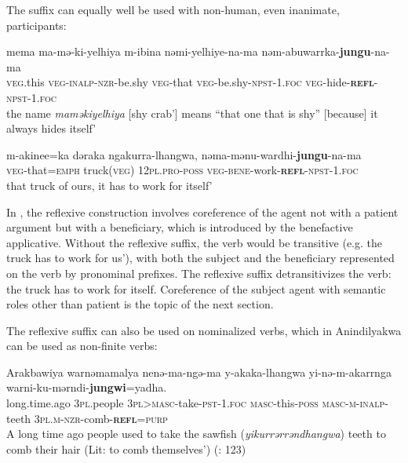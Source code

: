 \documentclass[output=paper]{langscibook}
\begin{document}
The suffix can equally well be used with non-human, even inanimate, participants:



\ea%
 \label{ex:vanegmond:21}
 \ea
 \label{ex:vanegmond:21a}
\gll mema ma-mə-ki-yelhiya m-ibina nəmi-yelhiye-na-ma nəm-abuwarrka-\textbf{jungu}-na-ma\\
\textsc{veg}.this \textsc{veg}-\textsc{inalp}-\textsc{nzr}-be.shy \textsc{veg}-that \textsc{veg}-be.shy-\textsc{npst}-1.\textsc{foc} \textsc{veg}-hide-\textbf{\textsc{refl}}-\textsc{npst}-1.\textsc{foc} \\
\glt the name \textit{maməkiyelhiya} [shy crab’] means “that one that is shy” [because] it always hides itself’

\ex
\label{ex:vanegmond:21b}
\gll m-akinee=ka dəraka ngakurra-lhangwa, nəma-mənu-wardhi-\textbf{jungu}-na-ma\\
\textsc{veg}-that=\textsc{emph} truck(\textsc{veg}) \textsc{12pl}.\textsc{pro}-\textsc{poss} \textsc{veg}-\textsc{bene}-work-\textbf{\textsc{refl}}-\textsc{npst}-1.\textsc{foc}\\
\glt that truck of ours, it has to work for itself’
\z
\z



In , the reflexive construction involves coreference of the agent not with a patient argument but with a beneficiary, which is introduced by the benefactive applicative. Without the reflexive suffix, the verb would be transitive (e.g. the truck has to work for us’), with both the subject and the beneficiary represented on the verb by pronominal prefixes. The reflexive suffix detransitivizes the verb: the truck has to work for itself. Coreference of the subject agent with semantic roles other than patient is the topic of the next section.



 The reflexive suffix can also be used on nominalized verbs, which in Anindilyakwa can be used as non-finite verbs:



\ea%
 \label{ex:vanegmond:22}
\gll Arakbawiya warnəmamalya nenə-ma-ngə-ma y-akaka-lhangwa yi-nə-m-akarrnga warni-ku-mərndi-\textbf{jungwi}=yadha.\\
 long.time.ago \textsc{3pl}.people \textsc{3pl}>\textsc{masc}-take-\textsc{pst}-1.\textsc{foc} \textsc{masc}-this-\textsc{poss}
 \textsc{masc}-\textsc{m}-\textsc{inalp}-teeth \textsc{3pl.m}-\textsc{nzr}-comb-\textbf{\textsc{refl}}=\textsc{purp}\\
\glt A long time ago people used to take the sawfish (\textit{yikurrərrəndhangwa}) teeth to comb their hair (Lit: to comb themselves’) (\citealt{GrooteEylandtDictionary1993}: 123)
\z
\end{document}

